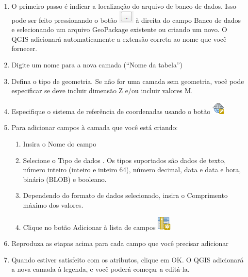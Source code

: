 \documentclass[
]{book}
\providecommand{\tightlist}{%
  \setlength{\itemsep}{0pt}\setlength{\parskip}{0pt}}
\begin{document}
\begin{enumerate}
\def\labelenumi{\arabic{enumi}.}
\setcounter{enumi}{1}
\item
  O primeiro passo é indicar a localização do arquivo de banco de dados. Isso pode ser feito pressionando o botão \includegraphics{media/modulo7/database-file-location.png} à direita do campo Banco de dados e selecionando um arquivo GeoPackage existente ou criando um novo. O QGIS adicionará automaticamente a extensão correta ao nome que você fornecer.
\item
  Digite um nome para a nova camada (``Nome da tabela'')
\item
  Defina o tipo de geometria. Se não for uma camada sem geometria, você pode especificar se deve incluir dimensão Z e/ou incluir valores M.
\item
  Especifique o sistema de referência de coordenadas usando o botão \includegraphics{media/modulo7/mActionSetProjection.png}
\item
  Para adicionar campos à camada que você está criando:

  \begin{enumerate}
  \def\labelenumii{\arabic{enumii}.}
  \tightlist
  \item
    Insira o Nome do campo
  \item
    Selecione o Tipo de dados . Os tipos suportados são dados de texto, número inteiro (inteiro e inteiro 64), número decimal, data e data e hora, binário (BLOB) e booleano.
  \item
    Dependendo do formato de dados selecionado, insira o Comprimento máximo dos valores.
  \item
    Clique no botão Adicionar à lista de campos \includegraphics{media/modulo7/mActionNewAttribute.png}
  \end{enumerate}
\item
  Reproduza as etapas acima para cada campo que você precisar adicionar
\item
  Quando estiver satisfeito com os atributos, clique em OK. O QGIS adicionará a nova camada à legenda, e você poderá começar a editá-la.
\end{enumerate}
\end{document}
